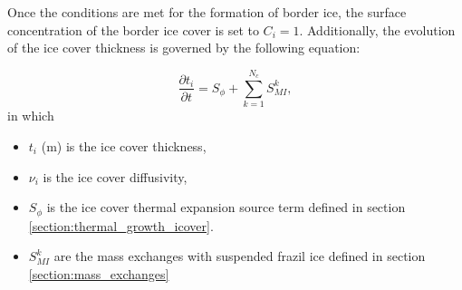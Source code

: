 Once the conditions are met for the formation of border ice, the surface concentration of the border ice cover is set to $C_i =1$. Additionally, the evolution of the ice cover thickness is governed by the following equation:

\begin{equation}
  \frac{\partial t_i}{\partial t} = S_{\phi} + \sum_{k=1}^{N_c} S_{MI}^k,
\end{equation}
in which
\begin{itemize}
\item $t_i$ (m) is the ice cover thickness,
\item $\nu_i$ is the ice cover diffusivity,
\item $S_{\phi}$ is the ice cover thermal expansion source term defined in section \ref{section:thermal_growth_icover}.
\item $S_{MI}^k$ are the mass exchanges with suspended frazil ice defined in section \ref{section:mass_exchanges}
\end{itemize}





